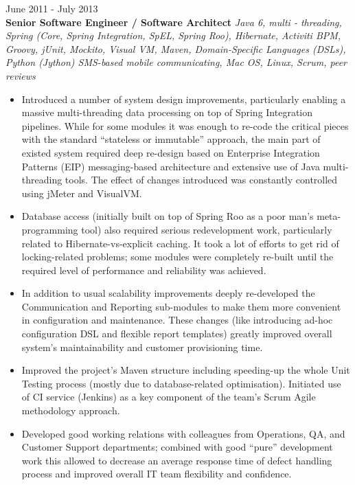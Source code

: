 \documentclass{res}
\begin{document}
\begin{resume}
 \hfill        June 2011 - July 2013 \\
{\bf Senior Software Engineer / Software Architect} {\em Java 6, multi - threading, Spring (Core, Spring Integration, SpEL, Spring Roo), Hibernate, Activiti BPM, Groovy, jUnit, Mockito, Visual VM, Maven, Domain-Specific Languages (DSLs), Python (Jython) SMS-based mobile communicating, Mac OS, Linux, Scrum, peer reviews}
\begin{itemize} \itemsep -2pt %
 \item Introduced a number of system design improvements, particularly enabling a massive multi-threading data processing on top of Spring Integration pipelines. While for some modules it was enough to re-code the critical pieces with the standard “stateless or immutable” approach, the main part of existed system required deep re-design based on Enterprise Integration Patterns (EIP) messaging-based architecture and extensive use of Java multi-threading tools. The effect of changes introduced was constantly controlled using jMeter and VisualVM.
 \item Database access (initially built on top of Spring Roo as a poor man's meta-programming tool) also required serious redevelopment work, particularly related to Hibernate-vs-explicit caching. It took a lot of efforts to get rid of locking-related problems; some modules were completely re-built until the required level of performance and reliability was achieved.
 \item In addition to usual scalability improvements deeply re-developed the Communication and Reporting sub-modules to make them more convenient in configuration and maintenance. These changes (like introducing ad-hoc configuration DSL and flexible report templates) greatly improved overall system's maintainability and customer provisioning time.
 \item 	Improved the project’s Maven structure including speeding-up the whole Unit Testing process (mostly due to database-related optimisation). Initiated use of CI service (Jenkins) as a key component of the team’s Scrum Agile methodology approach.
 \item Developed good working relations with colleagues from Operations, QA, and Customer Support departments; combined with good ``pure'' development work this allowed to decrease an average response time of defect handling process and improved overall IT team flexibility and confidence.
\end{itemize}


\end{resume}
\end{document}
